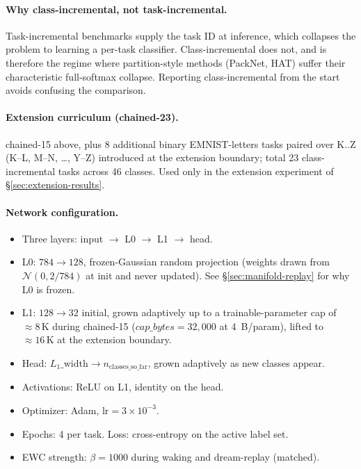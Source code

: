 \documentclass[11pt]{article}
\begin{document}
\paragraph{Why class-incremental, not task-incremental.}
Task-incremental benchmarks supply the task ID at inference, which
collapses the problem to learning a per-task classifier.
Class-incremental does not, and is therefore the regime where
partition-style methods (PackNet, HAT) suffer their characteristic
full-softmax collapse. Reporting class-incremental from the start
avoids confusing the comparison.

\paragraph{Extension curriculum (chained-23).}
chained-15 above, plus 8 additional binary EMNIST-letters tasks
paired over K..Z (K--L, M--N, \ldots, Y--Z) introduced at the
extension boundary; total 23 class-incremental tasks across 46
classes. Used only in the extension experiment of
\S\ref{sec:extension-results}.

\paragraph{Network configuration.}
\begin{itemize}[leftmargin=1.5em]
  \item Three layers: input $\to$ L0 $\to$ L1 $\to$ head.
  \item L0: $784 \to 128$, frozen-Gaussian random projection (weights
        drawn from $\mathcal{N}(0, 2/784)$ at init and never updated).
        See \S\ref{sec:manifold-replay} for why L0 is frozen.
  \item L1: $128 \to 32$ initial, grown adaptively up to a
        trainable-parameter cap of $\approx 8\,\text{K}$ during
        chained-15 ($\textit{cap\_bytes} = 32{,}000$ at 4~B/param),
        lifted to $\approx 16\,\text{K}$ at the extension boundary.
  \item Head: $L_1\text{\_width} \to n_{\text{classes\_so\_far}}$,
        grown adaptively as new classes appear.
  \item Activations: ReLU on L1, identity on the head.
  \item Optimizer: Adam, $\text{lr} = 3 \times 10^{-3}$.
  \item Epochs: 4 per task. Loss: cross-entropy on the active label
        set.
  \item EWC strength: $\beta = 1000$ during waking and dream-replay
        (matched).
\end{itemize}
\end{document}
